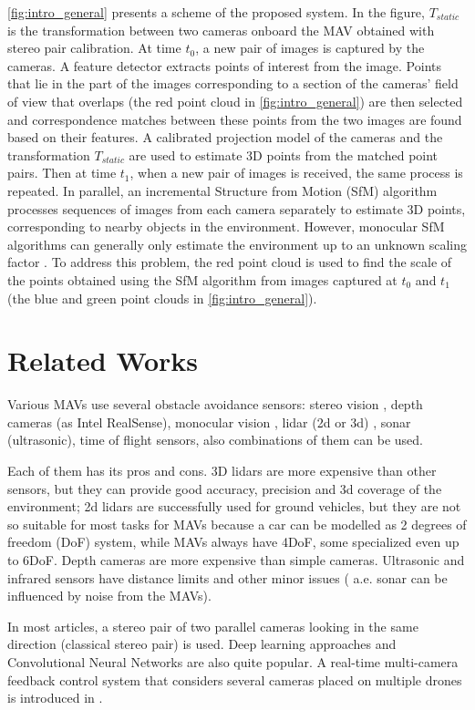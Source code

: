 \autoref{fig:intro_general} presents a scheme of the proposed system.
In the figure, $T_{static}$ is the transformation between two cameras onboard the MAV obtained with stereo pair calibration. 
At time $t_0$, a new pair of images is captured by the cameras.
A feature detector extracts points of interest from the image.
Points that lie in the part of the images corresponding to a section of the cameras' field of view that overlaps (the red point cloud in \autoref{fig:intro_general}) are then selected and correspondence matches between these points from the two images are found based on their features.
A calibrated projection model of the cameras and the transformation $T_{static}$ are used to estimate 3D points from the matched point pairs.
Then at time $t_1$, when a new pair of images is received, the same process is repeated. 
In parallel, an incremental Structure from Motion (SfM) algorithm processes sequences of images from each camera separately to estimate 3D points, corresponding to nearby objects in the environment. However, monocular SfM algorithms can generally only estimate the environment up to an unknown scaling factor \cite{SfM}. To address this problem, the red point cloud is used to find the scale of the points obtained using the SfM algorithm from images captured at $t_0$ and $t_1$ (the blue and green point clouds in \autoref{fig:intro_general}).

\section{Related Works}
Various MAVs use several obstacle avoidance sensors: stereo vision \cite{Ruf2018}, depth cameras (as Intel RealSense), monocular vision \cite{Mejias2010}, lidar (2d or 3d) \cite{Ramasamy2016}, sonar (ultrasonic), time of flight sensors, also combinations of them can be used. 

Each of them has its pros and cons. 
3D lidars are more expensive than other sensors, but they can provide good accuracy, precision and 3d coverage of the environment; 2d lidars are successfully used for ground vehicles, but they are not so suitable for most tasks for MAVs because a car can be modelled as 2 degrees of freedom (DoF) system, while MAVs always have 4DoF, some specialized even up to 6DoF. 
Depth cameras are more expensive than simple cameras. Ultrasonic and infrared sensors have distance limits and other minor issues ( a.e. sonar can be influenced by noise from the MAVs). 

In most articles, a stereo pair of two parallel cameras looking in the same direction (classical stereo pair) \cite{Lin2021} is used.
Deep learning approaches \cite{Back2020, FragaLamas2019, Park2020, Roghair2021} and Convolutional Neural Networks \cite{Yu2013, Ma2020} are also quite popular.
A real-time multi-camera feedback control system that considers several cameras placed on multiple drones is introduced in \cite{He2021}.

